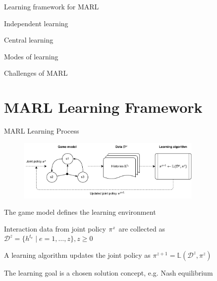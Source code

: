 

\leoslide

\subtitle{Multi-Agent Reinforcement Learning in Games: First Steps and Challenges}


\maketitle

\introslide

\begin{frame}{\outline}

\blist
    \item Learning framework for MARL
    \item Independent learning
    \item Central learning
    \item Modes of learning
    \item Challenges of MARL
\elist
\end{frame}

\section{MARL Learning Framework}

\begin{frame}[t]{MARL Learning Process}

\begin{figure}
    \centering
    \includegraphics[width=0.8\textwidth, height = 0.8\textheight, keepaspectratio]{images/chapter_5/learning-process.pdf}
\end{figure}

\blist
    \item The game model defines the learning environment
    \item Interaction data from joint policy $\pi^z$ are collected as $\mathcal{D}^{z} = \{ h^{t_e} \mid e = 1, \ldots, z\}, z \geq 0$
    \item A learning algorithm updates the joint policy as $\pi^{z+1} = \mathbb{L}(\mathcal{D}^{z}, \pi^{z})$
    \item The learning goal is a chosen solution concept, e.g. Nash equilibrium
\elist
    
\end{frame}

